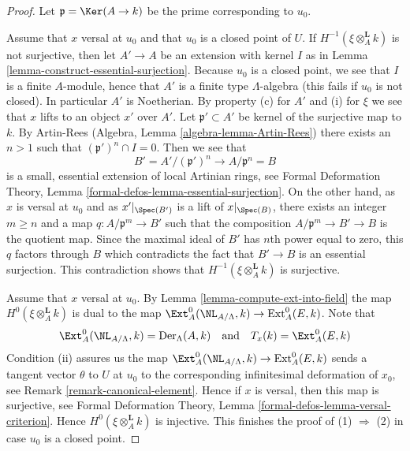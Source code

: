 \begin{proof}
Let $\mathfrak p = \Ker(A \to k)$ be the prime corresponding to $u_0$.

\medskip\noindent
Assume that $x$ versal at $u_0$ and that $u_0$ is a closed point of $U$.
If $H^{-1}(\xi \otimes_A^{\mathbf{L}} k)$ is not surjective, then
let $A' \to A$ be an extension with kernel $I$ as in
Lemma \ref{lemma-construct-essential-surjection}.
Because $u_0$ is a closed point, we see that $I$ is a finite $A$-module,
hence that $A'$ is a finite type $\Lambda$-algebra (this fails if
$u_0$ is not closed). In particular $A'$ is Noetherian.
By property (c) for $A'$ and (i) for $\xi$ we see that $x$ lifts to
an object $x'$ over $A'$.
Let $\mathfrak p' \subset A'$ be kernel of the surjective map to $k$.
By Artin-Rees (Algebra, Lemma \ref{algebra-lemma-Artin-Rees})
there exists an $n > 1$ such that $(\mathfrak p')^n \cap I = 0$.
Then we see that
$$
B' = A'/(\mathfrak p')^n \longrightarrow A/\mathfrak p^n = B
$$
is a small, essential extension of local Artinian rings, see
Formal Deformation Theory, Lemma
\ref{formal-defos-lemma-essential-surjection}.
On the other hand, as $x$ is versal at $u_0$ and as $x'|_{\Spec(B')}$
is a lift of $x|_{\Spec(B)}$, there exists an integer
$m \geq n$ and a map $q : A/\mathfrak p^m \to B'$
such that the composition
$A/\mathfrak p^m \to B' \to B$ is the quotient map.
Since the maximal ideal of $B'$ has $n$th power equal to zero, this
$q$ factors through $B$ which contradicts the fact that $B' \to B$ is an
essential surjection. This contradiction shows that
$H^{-1}(\xi \otimes_A^{\mathbf{L}} k)$
is surjective.

\medskip\noindent
Assume that $x$ versal at $u_0$. By Lemma \ref{lemma-compute-ext-into-field}
the map $H^0(\xi \otimes_A^{\mathbf{L}} k)$ is dual to the map
$\Ext^0_A(\NL_{A/\Lambda}, k) \to \text{Ext}^0_A(E, k)$. Note that
$$
\Ext^0_A(\NL_{A/\Lambda}, k) = \text{Der}_\Lambda(A, k)
\quad\text{and}\quad
T_x(k) = \Ext^0_A(E, k)
$$
Condition (ii) assures us the map
$\Ext^0_A(\NL_{A/\Lambda}, k) \to \text{Ext}^0_A(E, k)$
sends a tangent vector $\theta$ to $U$ at $u_0$ to the corresponding
infinitesimal deformation of $x_0$, see Remark \ref{remark-canonical-element}.
Hence if $x$ is versal, then this map is surjective, see
Formal Deformation Theory, Lemma \ref{formal-defos-lemma-versal-criterion}.
Hence $H^0(\xi \otimes_A^{\mathbf{L}} k)$ is injective.
This finishes the proof of (1) $\Rightarrow$ (2) in case $u_0$ is a
closed point.


\end{proof}
